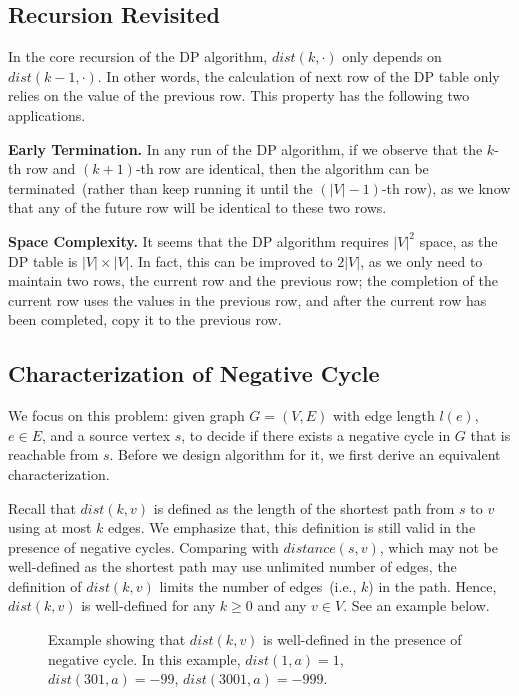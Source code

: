 \subsection*{Recursion Revisited}

In the core recursion of the DP algorithm,
$dist(k,\cdot)$ only depends on $dist(k - 1, \cdot)$.
In other words, the calculation of next row of the DP table
only relies on the value of the previous row.
This property has the following two applications.

{\bf Early Termination.} In any run of the DP algorithm, if we observe
that the $k$-th row and $(k+1)$-th row are identical,
then the algorithm can be terminated~(rather than keep running it until the $(|V|-1)$-th row),
as we know that any of the future row will be identical to these two rows.

{\bf Space Complexity.} It seems that the DP algorithm requires $|V|^2$ space,
as the DP table is $|V|\times |V|$.
In fact, this can be improved to $2|V|$,
as we only need to maintain two rows, the current row and
the previous row; the completion of the current row uses the values 
in the previous row, and after the current row has been completed,
copy it to the previous row.

\subsection*{Characterization of Negative Cycle}

We focus on this problem: given graph $G = (V,E)$ with edge length $l(e)$, $e\in E$, and
a source vertex $s$, to decide if there exists a negative cycle in $G$ that is reachable from $s$.
Before we design algorithm for it,
we first derive an equivalent characterization.

Recall that $dist(k,v)$ is defined as the length of the shortest path from $s$ to $v$ using
at most $k$ edges. We emphasize that, this definition is still valid in the presence of negative cycles.
Comparing with $distance(s,v)$, which may not be well-defined as the shortest path may use unlimited
number of edges, the definition of $dist(k,v)$ limits the number of edges~(i.e., $k$) in the path.
Hence, $dist(k,v)$ is well-defined for any $k\ge 0$ and any $v\in V$. See an example below.

\begin{figure}[h]
\centering{}
\caption{Example showing that $dist(k,v)$ is well-defined in the presence of negative cycle.
In this example, $dist(1,a) = 1$, $dist(301,a) = -99$, $dist(3001,a) = -999$.}
\label{fig:space}
\end{figure}

